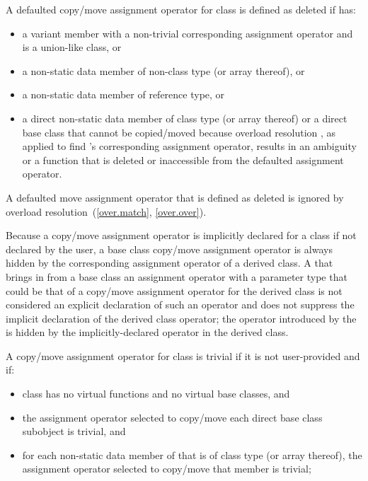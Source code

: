 \pnum
A defaulted copy/move assignment operator for
class  is defined as deleted if  has:
\begin{itemize}
\item a variant member with a non-trivial corresponding assignment operator and
   is a union-like class, or

\item a non-static data member of  non-class
  type (or array thereof), or

\item a non-static data member of reference type, or

\item a direct non-static data member of class type 
  (or array thereof) or a direct base class 
  that cannot be copied/moved because overload resolution
 , as applied to find 's corresponding
  assignment operator, results in an ambiguity or
  a function that is deleted or inaccessible from the
  defaulted assignment operator.
\end{itemize}

A defaulted move assignment operator that is defined as deleted is ignored by
overload resolution~(\ref{over.match}, \ref{over.over}).

\pnum
{}%
%
Because a copy/move assignment operator is implicitly declared for a class
if not declared by the user,
a base class copy/move assignment operator is always hidden
by the corresponding assignment operator of a derived class.
A
 that brings in from a base class an assignment operator
with a parameter type that could be that of a
copy/move assignment operator for the
derived class is not considered an explicit declaration of such an
operator and does not suppress the implicit declaration of the derived class
operator;
the operator introduced by the
is hidden by the implicitly-declared operator in the derived
class.

\pnum
{}%
%
A copy/move assignment operator for class
is
trivial
if it is not user-provided and if:

\begin{itemize}
\item
class
has no virtual functions
and no virtual base classes, and

\item the assignment operator selected to copy/move each direct
base class subobject is trivial, and

\item
for each non-static data member of
that is of class type (or array thereof),
the assignment operator selected to copy/move that member is trivial;
\end{itemize}

